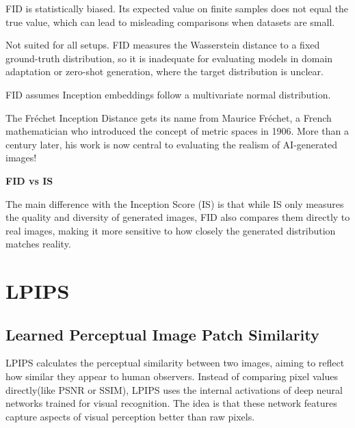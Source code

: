 {
\item FID is statistically biased. Its expected value on finite samples does not equal the true value, which can lead to misleading
comparisons when datasets are small.
\item Not suited for all setups. FID measures the Wasserstein distance to a fixed ground-truth distribution, so it is inadequate for
evaluating models in domain adaptation or zero-shot generation, where the target distribution is unclear.
\item FID assumes Inception embeddings follow a multivariate normal distribution.
}

\clearpage

\thispagestyle{customstyle}

{The Fréchet Inception Distance gets its name from Maurice Fréchet, a French mathematician who introduced the concept of metric spaces in 1906.
More than a century later, his work is now central to evaluating the realism of AI-generated images!}

\textbf{FID vs IS}

The main difference with the Inception Score (IS) is that while IS only measures the quality and diversity of generated images, FID also
compares them directly to real images, making it more sensitive to how closely the generated distribution matches reality.


\clearpage
\thispagestyle{genaistyle}
\section{LPIPS}
\subsection{Learned Perceptual Image Patch Similarity}


LPIPS calculates the perceptual similarity between two images, aiming to reflect how similar they appear to human observers.
Instead of comparing pixel values directly(like PSNR or SSIM), LPIPS uses the internal activations of deep neural networks trained for
visual recognition. The idea is that these network features capture aspects of visual perception better than raw pixels.

